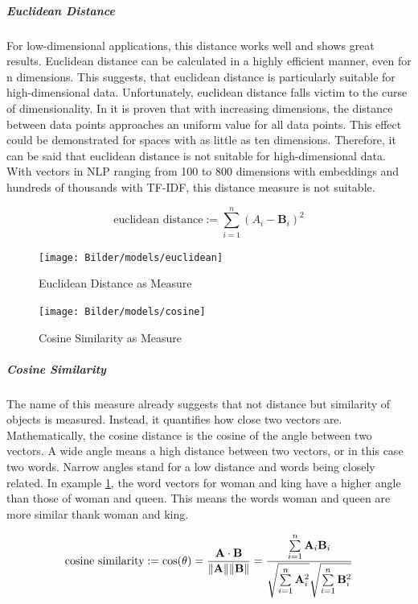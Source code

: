 	
		\subparagraph{Euclidean Distance} \label{euclidean}
		For low-dimensional applications, this distance works well and shows great results. Euclidean distance can be calculated in a highly efficient manner, even for n dimensions. This suggests, that euclidean distance is particularly suitable for high-dimensional data. Unfortunately, euclidean distance falls victim to the curse of dimensionality. In \cite[p.~1]{beyerNearestNeighbor} it is proven that with increasing dimensions, the distance between data points approaches an uniform value for all data points. This effect could be demonstrated for spaces with as little as ten dimensions. Therefore, it can be said that euclidean distance is not suitable for high-dimensional data. With vectors in \ac{NLP} ranging from 100 to 800 dimensions with embeddings and hundreds of thousands with \ac{TF-IDF}, this distance measure is not suitable.
		
				\[ 
		\text{euclidean distance} :=  \sum\limits_{i=1}^{n}{(A_i -  \mathbf{B}_i)^{2}} 
		\]
		
		\begin{figure} 
			\begin{minipage}{0.49\textwidth}
				\label{fig:euclidean}
				
				\texttt{[image: Bilder/models/euclidean]}
				\caption{Euclidean Distance as Measure}
			\end{minipage}
			\hfill
			\begin{minipage}{0.49\textwidth}
				\texttt{[image: Bilder/models/cosine]}
				\caption{Cosine Similarity as Measure}
				\label{fig:cosine}
			\end{minipage}
			\hfill
		\end{figure} 
	
		\subparagraph{Cosine Similarity}
		The name of this measure already suggests that not distance but similarity of objects is measured. Instead, it quantifies how close two vectors are.  Mathematically, the cosine distance is the cosine of the angle between two vectors. A wide angle means a high distance between two vectors, or in this case two words. Narrow angles stand for a low distance and words being closely related. In example \ref{fig:cosine}, the word vectors for woman and king have a higher angle than those of woman and queen. This means the words woman and queen are more similar thank woman and king.
		
		\[ 
		\text{cosine similarity} := \cos(\theta) = {\mathbf{A} \cdot \mathbf{B} \over \|\mathbf{A}\| \|\mathbf{B}\|} = \frac{ \sum\limits_{i=1}^{n}{\mathbf{A}_i  \mathbf{B}_i} }{ \sqrt{\sum\limits_{i=1}^{n}{\mathbf{A}_i^2}}  \sqrt{\sum\limits_{i=1}^{n}{\mathbf{B}_i^2}} }
		  \]
		
